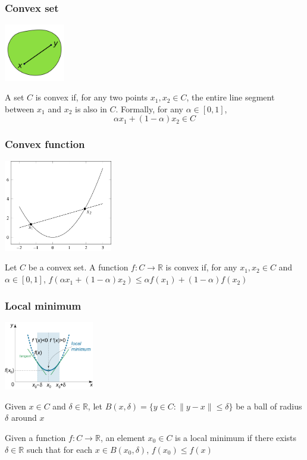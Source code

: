 \documentclass[10pt]{beamer}
\begin{document}
\begin{frame}
  \frametitle{Convex set}
  \begin{center}
  \includegraphics[height=2.5cm]{images/convex.png}
  \end{center}
  \begin{definition}
	A set $C$ is {\color{red} convex} if, for any two points $x_1,x_2\in C$, the entire line segment between $x_1$ and $x_2$ is also in $C$. Formally, for any $\alpha\in[0,1]$, \[\alpha x_1 + (1-\alpha)x_2 \in C\]
  \end{definition}
\end{frame}

\begin{frame}
  \frametitle{Convex function}
  \begin{center}
  \includegraphics[height=4cm]{images/convexfun.png}
  \end{center}
  \begin{definition}
	Let $C$ be a convex set. A function $f:C\rightarrow\mathbb{R}$ is {\color{red} convex} if, for any $x_1,x_2\in C$ and $\alpha\in[0,1]$, $f(\alpha x_1 + (1-\alpha)x_2) \leq \alpha f(x_1) + (1-\alpha) f(x_2)$
  \end{definition}
\end{frame}

\begin{frame}
  \frametitle{Local minimum}
  \begin{center}
  \includegraphics[height=3cm]{images/minimum.png}
  \end{center}
  Given $x\in C$ and $\delta\in\mathbb{R}$, let $B(x,\delta)=\{y \in C:\lVert y-x\rVert\leq \delta\}$ be a ball of radius $\delta$ around $x$
  \begin{definition}
	Given a function $f:C\rightarrow\mathbb{R}$, an element $x_0\in C$ is a {\color{red} local minimum} if there exists $\delta\in\mathbb{R}$ such that for each $x\in B(x_0,\delta)$, $f(x_0)\leq f(x)$
  \end{definition}
\end{frame}
\end{document}
